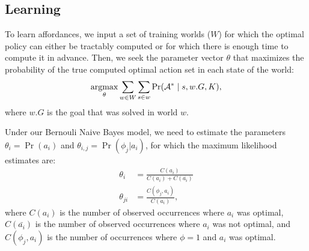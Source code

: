 \documentclass[conference]{IEEEtran}
\newcommand{\stnote}[1]{\textcolor{Blue}{\textbf{ST: #1}}}
\newcommand{\argmax}{\operatornamewithlimits{argmax}}
\begin{document}

\subsection{Learning}

To learn affordances, we input a set of training worlds ($W$) for which the optimal policy can either be tractably computed or for which there is enough time to compute it in advance. Then, we seek the parameter vector $\theta$ that maximizes the probability of the true computed optimal action set in each state of the world:
\begin{equation}
\argmax_\theta \sum_{w \in W} \sum_{s \in w} \Pr(\mathcal{A}^* \mid s, w.G, K),
\end{equation}
where $w.G$ is the goal that was solved in world $w$.

Under our Bernouli Naive Bayes model, we need to estimate the parameters $\theta_i = \Pr(a_i)$ and $\theta_{i,j} = \Pr(\phi_j | a_i)$, for which the maximum likelihood estimates are:
\begin{align}
\theta_i &= \frac{C(a_i)}{C(a_i) + C(\bar{a_i})} \\
\theta_{ji} &= \frac{C(\phi_j, a_i)}{C(a_i)},
\end{align}
where $C(a_i)$ is the number of observed occurrences where $a_i$ was optimal, $C(\bar{a_i})$ is the number of observed occurrences where $a_i$ was not optimal, and $C(\phi_j, a_i)$ is the number of occurrences where $\phi=1$ and $a_i$ was optimal.
\end{document}
